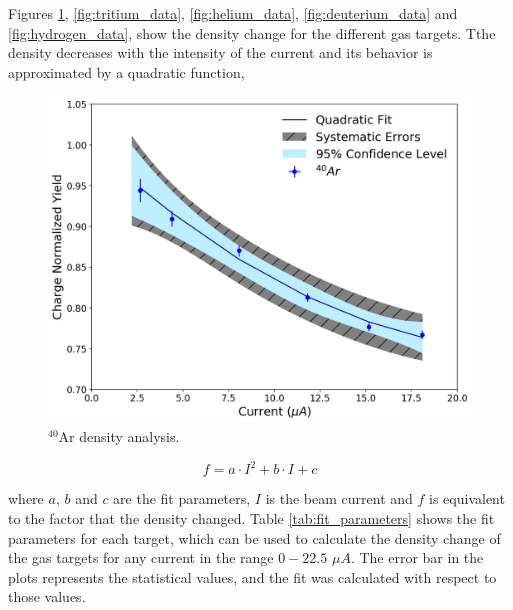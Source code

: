\documentclass[final,5p,times,twocolumn,balance]{elsarticle}
\begin{document}
Figures  \ref{fig:argon_data}, \ref{fig:tritium_data}, \ref{fig:helium_data}, \ref{fig:deuterium_data} and \ref{fig:hydrogen_data},  show the density  change for the different gas targets. Tthe density decreases with the intensity of the current and its behavior is approximated by a quadratic function,  

\begin{figure}[!h]
 \centering
 \includegraphics[width=\linewidth]{images/argon_data.pdf}
  \caption{$^{40}$Ar density analysis.}
  \label{fig:argon_data}
\end{figure}


\begin{equation}
f = a\cdot I^{2} + b \cdot {I} + c
\label{eq:boiling_factor}
\end{equation}

\noindent where $a$, $b$ and $c$ are the fit parameters, $I$ is the beam current and $f$ is equivalent to the factor that the density changed. Table \ref{tab:fit_parameters} shows the fit parameters for each target, which can be used to calculate the density change of the gas targets for any current in the range $0-22.5$ $\mu A$. The error bar in the plots represents the statistical values, and the fit was calculated with respect to those values. 
\end{document}
